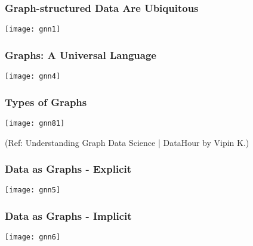 \begin{frame}[fragile]\frametitle{ Graph-structured Data Are Ubiquitous }

\begin{center}
\texttt{[image: gnn1]}
\end{center}	  

\end{frame}



\begin{frame}[fragile]\frametitle{Graphs: A Universal Language }

\begin{center}
\texttt{[image: gnn4]}
\end{center}	  

\end{frame}

\begin{frame}[fragile]\frametitle{Types of Graphs}

\begin{center}
\texttt{[image: gnn81]}

{\tiny (Ref: Understanding Graph Data Science | DataHour by Vipin K.)}
\end{center}	  

\end{frame}


\begin{frame}[fragile]\frametitle{Data as Graphs - Explicit }

\begin{center}
\texttt{[image: gnn5]}
\end{center}	  

\end{frame}

\begin{frame}[fragile]\frametitle{Data as Graphs - Implicit }

\begin{center}
\texttt{[image: gnn6]}
\end{center}	  

\end{frame}


